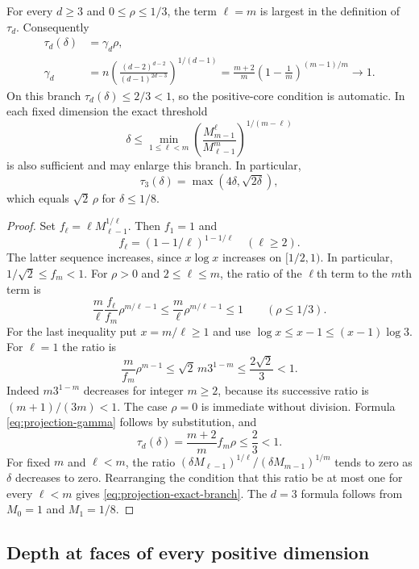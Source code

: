 \begin{proposition}
\label{prop:projection-top-spectrum}
For every $d\geq3$ and $0\leq\rho\leq1/3$, the term $\ell=m$ is
largest in the definition of $\tau_d$.  Consequently
\begin{align}
 \tau_d(\delta)&=\gamma_d\rho,\nonumber\\
 \gamma_d&=n\left(
       \frac{(d-2)^{d-2}}{(d-1)^{2d-3}}\right)^{1/(d-1)}
   =\frac{m+2}{m}\left(1-\frac1m\right)^{(m-1)/m}
   \longrightarrow1.
 \label{eq:projection-gamma}
\end{align}
On this branch $\tau_d(\delta)\leq2/3<1$, so the positive-core
condition is automatic.  In each fixed dimension the exact threshold
\begin{equation}
 \delta\leq
 \min_{1\leq\ell<m}
 \left(\frac{M_{m-1}^{\ell}}{M_{\ell-1}^{m}}
 \right)^{1/(m-\ell)}
 \label{eq:projection-exact-branch}
\end{equation}
is also sufficient and may enlarge this branch.  In particular,
\[
 \tau_3(\delta)=\max(4\delta,\sqrt{2\delta}),
\]
which equals $\sqrt2\,\rho$ for $\delta\leq1/8$.
\end{proposition}

\begin{proof}
Set $f_\ell=\ell M_{\ell-1}^{1/\ell}$.  Then $f_1=1$ and
\[
 f_\ell=(1-1/\ell)^{1-1/\ell}\quad(\ell\geq2).
\]
The latter sequence increases, since $x\log x$ increases on
$[1/2,1)$.  In particular, $1/\sqrt2\leq f_m<1$.
For $\rho>0$ and $2\leq\ell\leq m$, the ratio of the $\ell$th
term to the $m$th term is
\[
 \frac m\ell\frac{f_\ell}{f_m}\rho^{m/\ell-1}
 \leq\frac m\ell\rho^{m/\ell-1}\leq1
 \qquad(\rho\leq1/3).
\]
For the last inequality put $x=m/\ell\geq1$ and use
$\log x\leq x-1\leq(x-1)\log3$.  For $\ell=1$ the ratio is
\[
 \frac m{f_m}\rho^{m-1}
 \leq\sqrt2\,m3^{1-m}\leq\frac{2\sqrt2}{3}<1.
\]
Indeed $m3^{1-m}$ decreases for integer $m\geq2$, because its
successive ratio is $(m+1)/(3m)<1$.  The case $\rho=0$ is immediate
without division.  Formula \eqref{eq:projection-gamma} follows by
substitution, and
\[
 \tau_d(\delta)=\frac{m+2}{m}f_m\rho\leq\frac23<1.
\]
For fixed $m$ and $\ell<m$, the ratio
$(\delta M_{\ell-1})^{1/\ell}/
(\delta M_{m-1})^{1/m}$ tends to zero as $\delta$ decreases to
zero.  Rearranging the condition that this ratio be at most one for
every $\ell<m$ gives \eqref{eq:projection-exact-branch}.
The $d=3$ formula follows from $M_0=1$ and $M_1=1/8$.
\end{proof}

\subsection{Depth at faces of every positive dimension}

